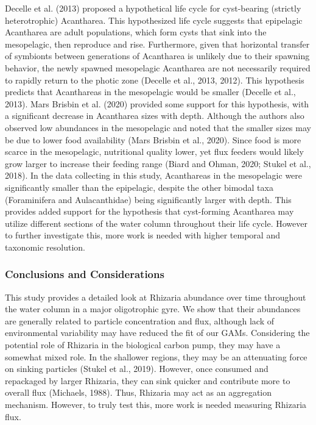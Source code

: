 \documentclass[
]{article}
\begin{document}
Decelle et al. (2013) proposed a hypothetical life cycle for
cyst-bearing (strictly heterotrophic) Acantharea. This hypothesized life
cycle suggests that epipelagic Acantharea are adult populations, which
form cysts that sink into the mesopelagic, then reproduce and rise.
Furthermore, given that horizontal transfer of symbionts between
generations of Acantharea is unlikely due to their spawning behavior,
the newly spawned mesopelagic Acantharea are not necessarily required to
rapidly return to the photic zone (Decelle et al., 2013, 2012). This
hypothesis predicts that Acanthareas in the mesopelagic would be smaller
(Decelle et al., 2013). Mars Brisbin et al. (2020) provided some support
for this hypothesis, with a significant decrease in Acantharea sizes
with depth. Although the authors also observed low abundances in the
mesopelagic and noted that the smaller sizes may be due to lower food
availability (Mars Brisbin et al., 2020). Since food is more scarce in
the mesopelagic, nutritional quality lower, yet flux feeders would
likely grow larger to increase their feeding range (Biard and Ohman,
2020; Stukel et al., 2018). In the data collecting in this study,
Acanthareas in the mesopelagic were significantly smaller than the
epipelagic, despite the other bimodal taxa (Foraminifera and
Aulacanthidae) being significantly larger with depth. This provides
added support for the hypothesis that cyst-forming Acantharea may
utilize different sections of the water column throughout their life
cycle. However to further investigate this, more work is needed with
higher temporal and taxonomic resolution.

\subsubsection{Conclusions and
Considerations}\label{conclusions-and-considerations}

This study provides a detailed look at Rhizaria abundance over time
throughout the water column in a major oligotrophic gyre. We show that
their abundances are generally related to particle concentration and
flux, although lack of environmental variability may have reduced the
fit of our GAMs. Considering the potential role of Rhizaria in the
biological carbon pump, they may have a somewhat mixed role. In the
shallower regions, they may be an attenuating force on sinking particles
(Stukel et al., 2019). However, once consumed and repackaged by larger
Rhizaria, they can sink quicker and contribute more to overall flux
(Michaels, 1988). Thus, Rhizaria may act as an aggregation mechanism.
However, to truly test this, more work is needed measuring Rhizaria
flux.
\end{document}

